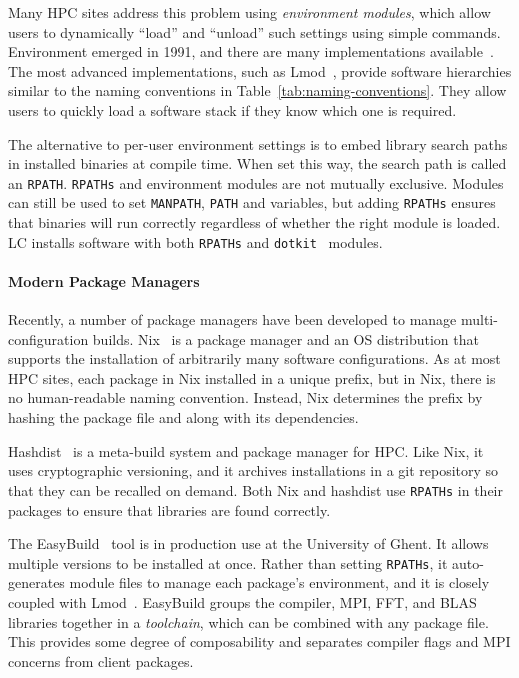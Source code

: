 Many HPC sites address this problem using {\it environment modules}, which allow
users to dynamically ``load'' and ``unload'' such settings using simple commands.
Environment emerged in 1991, and there are many implementations 
available~\cite{dotkit,furlani+:lisa91,furlani+:lisa96,mclay:lmod,mclay:lmod-tutorial}.
The most advanced implementations, such as Lmod~\cite{mclay:lmod,mclay:lmod-tutorial},
provide software hierarchies similar to the naming conventions in 
Table~\ref{tab:naming-conventions}. They allow users to quickly load a software stack
if they know which one is required.

The alternative to per-user environment settings is to embed library search paths
in installed binaries at compile time. When set this way, the search path is called
an {\tt RPATH}. {\tt RPATHs} and environment modules are not mutually exclusive.
Modules can still be used to set {\tt MANPATH}, {\tt PATH} and variables, but
adding {\tt RPATHs} ensures that binaries will run correctly regardless of whether
the right module is loaded. LC installs software with both {\tt RPATHs} and
{\tt dotkit}~\cite{dotkit} modules.

\paragraph{Modern Package Managers}

Recently, a number of package managers have been developed to manage 
multi-configuration builds.
%
Nix~\cite{dolstra+:icfp08,dolstra+:lisa04}
is a package manager and an OS distribution that supports the installation of
arbitrarily many software configurations.  As at most HPC sites, each package
in Nix installed in a unique prefix, but in Nix, there is no human-readable
naming convention.  Instead, Nix determines the prefix by hashing the package
file and along with its dependencies.

Hashdist~\cite{hashdist} is a meta-build system and package manager for HPC.
Like Nix, it uses cryptographic versioning, and it archives installations
in a git repository so that they can be recalled on demand. 
%
Both Nix and hashdist use {\tt RPATHs} in their packages to ensure that
libraries are found correctly. 

The EasyBuild~\cite{hoste+:pyhpc12} tool is in production use at
the University of Ghent.  It allows multiple versions to be installed
at once.  Rather than setting {\tt RPATHs}, it auto-generates module files
to manage each package's environment, and it is closely coupled with 
Lmod~\cite{geimer+:hust14}.  EasyBuild groups the compiler, MPI, FFT, and
BLAS libraries together in a {\it toolchain}, which can be combined with
any package file. This provides some degree of composability and
separates compiler flags and MPI concerns from client packages.

